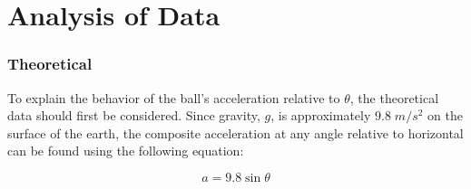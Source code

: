 
\section*{Analysis of Data}

\subsubsection*{Theoretical}
\label{subs:Theoretical}

To explain the behavior of the ball's acceleration relative to $\theta$, the theoretical data should first be considered. Since gravity, $g$, is approximately $9.8\;m/s^2$ on the surface of the earth, the composite acceleration at any angle relative to horizontal can be found using the following equation:

\begin{equation}
  a = 9.8\sin{\theta}
\end{equation}

\begin{table}[H]
  \centering
  \caption{Theoretical Data}
  \label{table:theoretical_data_table}
\end{table}

